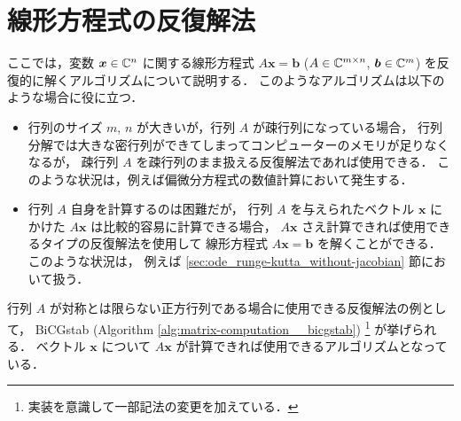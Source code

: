 %

\section{線形方程式の反復解法}

ここでは，変数 $\bm{x} \in \mathbb{C}^n$ に関する線形方程式
$A \bm{x} = \bm{b}$
($A \in \mathbb{C}^{m \times n}$, $\bm{b} \in \mathbb{C}^m$)
を反復的に解くアルゴリズムについて説明する．
このようなアルゴリズムは以下のような場合に役に立つ．
\begin{itemize}
    \item 行列のサイズ $m$, $n$ が大きいが，行列 $A$ が疎行列になっている場合，
          行列分解では大きな密行列ができてしまってコンピューターのメモリが足りなくなるが，
          疎行列 $A$ を疎行列のまま扱える反復解法であれば使用できる．
          このような状況は，例えば偏微分方程式の数値計算において発生する．
    \item 行列 $A$ 自身を計算するのは困難だが，
          行列 $A$ を与えられたベクトル $\bm{x}$ にかけた $A \bm{x}$ は比較的容易に計算できる場合，
          $A \bm{x}$ さえ計算できれば使用できるタイプの反復解法を使用して
          線形方程式 $A \bm{x} = \bm{b}$ を解くことができる．
          このような状況は，
          例えば \ref{sec:ode_runge-kutta_without-jacobian} 節において扱う．
\end{itemize}


行列 $A$ が対称とは限らない正方行列である場合に使用できる反復解法の例として，
BiCGstab (Algorithm \ref{alg:matrix-computation__bicgstab})
\footnote{実装を意識して一部記法の変更を加えている．}
が挙げられる．
ベクトル $\bm{x}$ について $A \bm{x}$ が計算できれば使用できるアルゴリズムとなっている．

